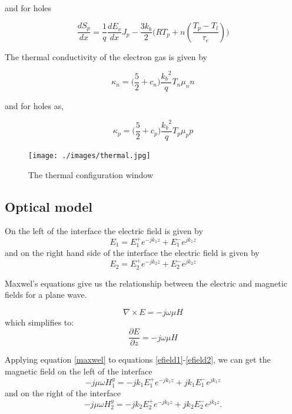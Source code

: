 \documentclass[11pt]{article}
\begin{document}
and for holes

\begin{equation}
\frac{dS_{p}}{dx}=\frac{1}{q}\frac{dE_{v}}{dx} J_{p}-\frac{3 k_{b}}{2} \Bigg( R T_{p}+ n(\frac{T_{p}-T_{l}}{\tau_{e}}) \Bigg)
\end{equation}

The thermal conductivity of the electron gas is given by

\begin{equation}
\kappa_{n}=\Bigg ( \frac{5}{2} +c_n\Bigg) \frac{{k_{b}}^2}{q} T_{n} \mu_n n
\end{equation}

and for holes as,

\begin{equation}
\kappa_{p}=\Bigg ( \frac{5}{2} +c_p\Bigg) \frac{{k_{b}}^2}{q} T_{p} \mu_p p
\end{equation}


\begin{figure}[!htb]
\centering
\texttt{[image: ./images/thermal.jpg]}
{\caption{The thermal configuration window}}
\label{fig:thermal}
\end{figure}

\subsection{Optical model}
On the left of the interface the electric field is given by
\begin{equation}
E_{1}=E^{+}_{1} e^{-j k_1 z}+E^{-}_{1} e^{j k_1 z}
\label{efield1}
\end{equation}
and on the right hand side of the interface the electric field is given by
\begin{equation}
E_{2}=E^{+}_{2} e^{-j k_2 z}+E^{-}_{2} e^{j k_2 z}
\label{efield2}
\end{equation}

Maxwel's equations give us the relationship between the electric and magnetic fields for a plane wave.

\begin{equation}
\nabla \times E=-j\omega \mu H 
\end{equation}
which simplifies to:
\begin{equation}
\frac{\partial E} {\partial z}=-j\omega \mu H 
\label{maxwel}
\end{equation}

Applying equation \ref{maxwel} to equations \ref{efield1}-\ref{efield2}, we can get the magnetic field on the left of the interface
\begin{equation}
-j \mu \omega H^{y}_{1}=-j k_1 E^{+}_{1} e^{-j k_1 z}+j k_1 E^{-}_{1} e^{j k_1 z}
\end{equation}
and on the right of the interface
\begin{equation}
-j \mu \omega H^{y}_{2}=-j k_2 E^{+}_{2} e^{-j k_2 z}+j k_2 E^{-}_{2} e^{j k_2 z}.
\end{equation}
\end{document}
